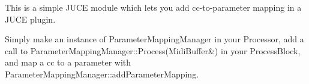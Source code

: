 This is a simple J\+U\+CE module which lets you add cc-\/to-\/parameter mapping in a J\+U\+CE plugin.

Simply make an instance of {\ttfamily Parameter\+Mapping\+Manager} in your Processor, add a call to {\ttfamily Parameter\+Mapping\+Manager\+::\+Process(\+Midi\+Buffer\&)} in your Process\+Block, and map a cc to a parameter with {\ttfamily Parameter\+Mapping\+Manager\+::add\+Parameter\+Mapping}. 